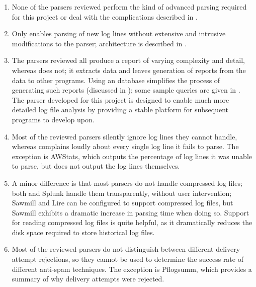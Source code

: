 \begin{enumerate}

    \item None of the parsers reviewed perform the kind of advanced parsing
        required for this project or deal with the complications described
        in .

    \item Only \parsername{} enables parsing of new log lines without
        extensive and intrusive modifications to the parser; \parsernames{}
        architecture is described in .

    \item The parsers reviewed all produce a report of varying complexity
        and detail, whereas  does not; it extracts data and
        leaves generation of reports from the data to other programs.
        Using an  database simplifies the process of
        generating such reports (discussed in ); some sample queries are given in .
        The parser developed for this project is designed to enable much
        more detailed log file analysis by providing a stable platform for
        subsequent programs to develop upon.

    \item Most of the reviewed parsers silently ignore log lines they
        cannot handle, whereas \parsername{} complains loudly about every
        single log line it fails to parse.  The exception is AWStats, which
        outputs the percentage of log lines it was unable to parse, but
        does not output the log lines themselves.

    \item A minor difference is that most parsers do not handle compressed
        log files; both \parsername{} and Splunk handle them transparently,
        without user intervention; Sawmill and Lire can be configured to
        support compressed log files, but Sawmill exhibits a dramatic
        increase in parsing time when doing so.  Support for reading
        compressed log files is quite helpful, as it dramatically reduces
        the disk space required to store historical log files.

    \item Most of the reviewed parsers do not distinguish between different
        delivery attempt rejections, so they cannot be used to determine
        the success rate of different anti-spam techniques.  The exception
        is Pflogsumm, which provides a summary of why delivery attempts
        were rejected.

\end{enumerate}

